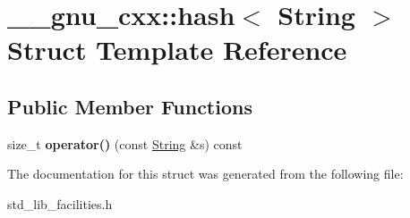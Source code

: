 \hypertarget{struct____gnu__cxx_1_1hash_3_01_string_01_4}{\section{\-\_\-\-\_\-gnu\-\_\-cxx\-:\-:hash$<$ String $>$ Struct Template Reference}
\label{struct____gnu__cxx_1_1hash_3_01_string_01_4}
}
\subsection*{Public Member Functions}
\begin{DoxyCompactItemize}
\item 
\hypertarget{struct____gnu__cxx_1_1hash_3_01_string_01_4_a69e0d4b45db059dc8b2dd1c06e030b02}{size\-\_\-t {\bfseries operator()} (const \hyperlink{struct_string}{String} \&s) const }\label{struct____gnu__cxx_1_1hash_3_01_string_01_4_a69e0d4b45db059dc8b2dd1c06e030b02}

\end{DoxyCompactItemize}


The documentation for this struct was generated from the following file\-:\begin{DoxyCompactItemize}
\item 
std\-\_\-lib\-\_\-facilities.\-h\end{DoxyCompactItemize}
